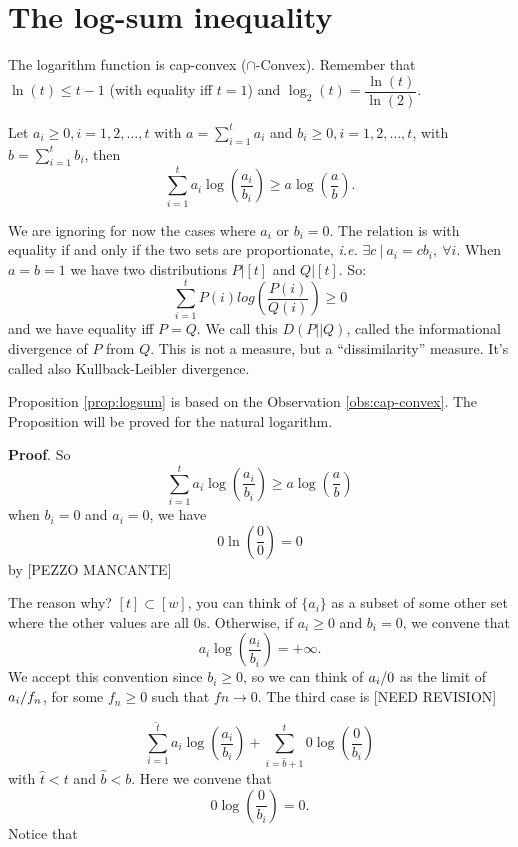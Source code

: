 \section{The log-sum inequality}
\begin{obs}\label{obs:cap-convex}
	The logarithm function is cap-convex ($\cap$-Convex). Remember that $\ln(t) \leq t - 1$ (with equality iff $t=1$) and $\log_2(t) = \dfrac{\ln(t)}{\ln(2)}$.
	
\end{obs}

\begin{prop}\label{prop:logsum}
	Let $a_i \geq 0, i = 1, 2, \ldots, t$ with $a = \sum_{i = 1}^t a_i$ and $b_i \geq 0, i = 1, 2, \ldots, t$, with $b = \sum_{i = 1}^t b_i$, then $$\sum_{i= 1}^ta_i\log\left(\dfrac{a_i}{b_i}\right)\geq a\log\left(\dfrac{a}{b}\right).$$
\end{prop}

We are ignoring for now the cases where $a_i$ or $b_i = 0$. The relation is with equality if and only if  the two sets are proportionate, \emph{i.e.} $\exists c \ |\ a_i = cb_i,\ \forall i$. When $a = b = 1$ we have two distributions $P|[t]$ and $Q|[t]$. So:
\[
\sum_{i = 1}^tP(i)log\left(\dfrac{P(i)}{Q(i)}\right)\geq 0
 \]
 and we have equality iff $P = Q$. We call this $D(P||Q)$, called the informational divergence of $P$ from $Q$. This is not a measure, but a ``dissimilarity'' measure. It's called also Kullback-Leibler divergence. 
 
 Proposition \ref{prop:logsum} is based on the Observation \ref{obs:cap-convex}. The Proposition will be proved for the natural logarithm.
 
 \noindent\textbf{Proof}. So $$\sum_{i= 1}^ta_i\log\left(\dfrac{a_i}{b_i}\right)\geq a\log\left(\dfrac{a}{b}\right)$$ when $b_i = 0$ and $a_i = 0$, we have $$0\ln(\dfrac{0}{0}) = 0$$ by [PEZZO MANCANTE]
 
 The reason why? $[t] \subset [w]$, you can think of $\{a_i\}$ as a subset of some other set where the other values are all $0$s. Otherwise, if $a_i \geq 0$ and $b_i = 0$, we convene that $$a_i\log\left(\dfrac{a_i}{b_i}\right) = +\infty.$$ We accept this convention since $b_i \geq 0$, so we can think of ${a_i}/{0}$ as the limit of ${a_i}/{f_n}$, for some $f_n\geq 0$ such that $fn \rightarrow 0$. The third case is [NEED REVISION]
 
\[
  \sum_{i= 1}^{\hat{t}}a_i\log\left(\dfrac{a_i}{b_i}\right)+ \sum_{i=\hat{b} + 1}^t 0\log\left(\dfrac{0}{b_i}\right)
 \]
 with $\hat{t} < t$ and $\hat{b} < b$. Here we convene that $$0\log\left(\dfrac{0}{b_i}\right) = 0.$$ Notice that 
 
